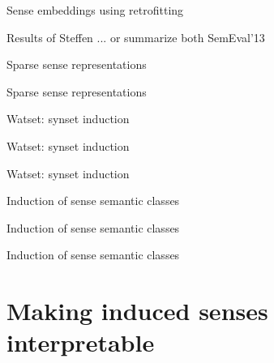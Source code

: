 \documentclass{beamer}
\begin{document}
\begin{frame}{Sense embeddings using retrofitting}

Results of Steffen ... or summarize both SemEval'13 

\end{frame}



\begin{frame}{Sparse sense representations}
	
\end{frame}


\begin{frame}{Sparse sense representations}
	
\end{frame}

\begin{frame}{Watset: synset induction}
	
\end{frame}


\begin{frame}{Watset: synset induction}
	
\end{frame}


\begin{frame}{Watset: synset induction}
	
\end{frame}


\begin{frame}{Induction of sense semantic classes}
	
\end{frame}

\begin{frame}{Induction of sense semantic classes}
	
\end{frame}

\begin{frame}{Induction of sense semantic classes}
	
\end{frame}

\section{Making induced senses interpretable}
\end{document}
